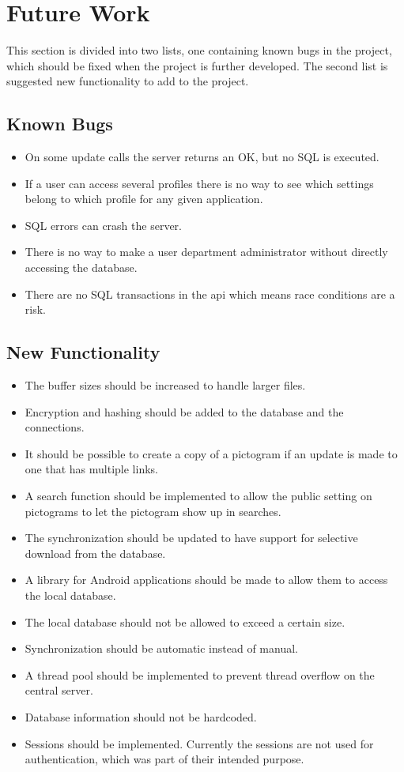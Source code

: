 \section{Future Work}
This section is divided into two lists, one containing known bugs in the project, which should be fixed when the project is further developed. The second list is suggested new functionality to add to the project.

\subsection{Known Bugs}\label{subs:known_bugs}
\begin{itemize}
\item On some update calls the server returns an OK, but no SQL is executed.
\item If a user can access several profiles there is no way to see which settings belong to which profile for any given application.
\item SQL errors can crash the server.
\item There is no way to make a user department administrator without directly accessing the database.
\item There are no SQL transactions in the \ac{api} which means race conditions are a risk. 
\end{itemize}

\subsection{New Functionality}
\begin{itemize}
\item The buffer sizes should be increased to handle larger files.
\item Encryption and hashing should be added to the database and the connections.
\item It should be possible to create a copy of a pictogram if an update is made to one that has multiple links.
\item A search function should be implemented to allow the public setting on pictograms to let the pictogram show up in searches.
\item The synchronization should be updated to have support for selective download from the database.
\item A library for Android applications should be made to allow them to access the local database.
\item The local database should not be allowed to exceed a certain size.
\item Synchronization should be automatic instead of manual.
\item A thread pool should be implemented to prevent thread overflow on the central server.
\item Database information should not be hardcoded.
\item Sessions should be implemented. Currently the sessions are not used for authentication, which was part of their intended purpose.
\end{itemize}
